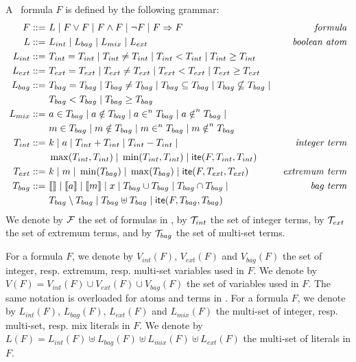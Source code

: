 \begin{small}
\begin{mydef}
A \QFBILIA\ formula $F$ is defined by the following grammar:
\begin{align*}
F ::= &\ L \; | \; F\lor F \; | \; F\land F \; | \; \lnot F \; | \; F\Rightarrow F
& \textit{formula}
\\
L ::= &\ L_{int} \; |\; L_{bag} \; |\; L_{mix} \; |\; L_{ext}
& \textit{boolean atom}
\\
L_{int} ::= &\ T_{int} = T_{int} \; |\; T_{int} \neq T_{int} \; |\; T_{int} < T_{int}\; |\;  T_{int} \ge T_{int}
\\
L_{ext} ::= &\ T_{ext} = T_{ext} \; |\; T_{ext} \neq T_{ext} \; |\; T_{ext} < T_{ext}\; |\;  T_{ext} \ge T_{ext}
\\
L_{bag} ::= &\ T_{bag} = T_{bag} \; |\;T_{bag} \neq T_{bag} \; |\;
T_{bag} \subseteq T_{bag} \; |\;T_{bag} \nsubseteq T_{bag} \; | \;
\\
&\ T_{bag} < T_{bag} \; |\;T_{bag} \ge T_{bag}
\\
L_{mix} ::= &\ a \in T_{bag}\; |\;a \notin T_{bag}\; |\;a \in^{n} T_{bag}\; |\;a \notin^{n} T_{bag}\;|\;
\\
&\ m \in T_{bag}\; |\;m \notin T_{bag}\; |\;m \in^{n} T_{bag}\; |\;m \notin^{n} T_{bag}
\\
T_{int} ::= &\  k \;|\; a \;|\; T_{int} + T_{int} \;|\; T_{int} - T_{int}\;|\;
& \textit{integer term}
\\
&\ \max(T_{int},T_{int})\;|\; \min(T_{int},T_{int}) \;|\; \textsf{ite}(F,T_{int},T_{int})
\\
T_{ext} ::= &\ k \;|\; m \;|\; \min(T_{bag}) \;|\; \max(T_{bag}) \;|\; \textsf{ite}(F,T_{ext},T_{ext})
& \textit{extremum term}
\\
T_{bag} ::= &\ \llbracket  \rrbracket\;|\;\llbracket a \rrbracket \;|\;\llbracket m \rrbracket \;|\;x \;|\; T_{bag} \cup T_{bag} \;|\; T_{bag} \cap T_{bag} \;|\;
& \textit{bag term}
\\
&\ T_{bag} \setminus T_{bag}\;|\; T_{bag} \uplus T_{bag} \;|\; \textsf{ite}(F,T_{bag},T_{bag})
\\
\end{align*}
We denote by $\mathcal{F}$ the set of formulas in \QFBILIA, by $\mathcal{T}_{int}$ the set of integer terms, by $\mathcal{T}_{ext}$ the set of extremum terms, and by $\mathcal{T}_{bag}$ the set of multi-set terms.
\end{mydef}
\end{small}

For a formula $F$, we denote by $V_{int}(F)$, $V_{ext}(F)$ and $V_{bag}(F)$  the set of integer, resp. extremum, resp. multi-set variables used in $F$.
We denote by $V(F) = V_{int}(F) \cup V_{ext}(F) \cup V_{bag}(F)$ the set of variables used in $F$.
The same notation is overloaded for atoms and terms in \QFBILIA.
For a formula $F$, we denote by $L_{int}(F)$, $L_{bag}(F)$, $L_{ext}(F)$ and $L_{mix}(F)$ the multi-set of integer, resp. multi-set, resp. mix literals in $F$.
We denote by $L(F) = L_{int}(F) \uplus L_{bag}(F) \uplus L_{mix}(F) \uplus L_{ext}(F)$ the multi-set of literals in $F$.




